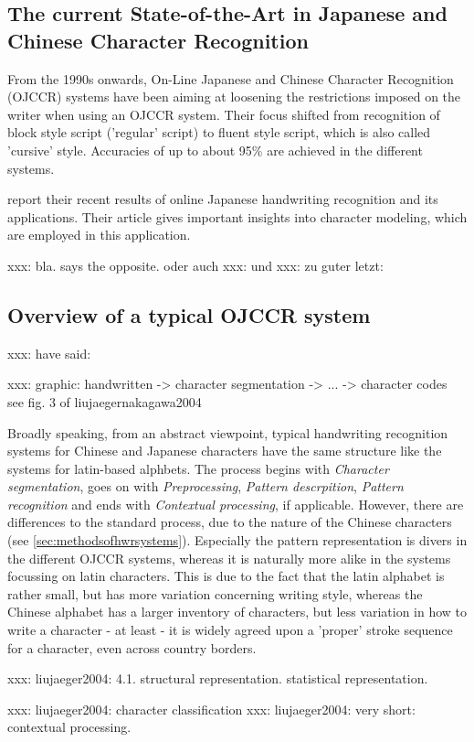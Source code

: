 \subsection{The current State-of-the-Art in Japanese and Chinese Character Recognition}
From the 1990s onwards, On-Line Japanese and Chinese Character Recognition 
(OJCCR) systems have been aiming at loosening the restrictions imposed on 
the writer when using an OJCCR system. Their focus shifted from recognition 
of block style script ('regular' script) to fluent style script, 
which is also called 'cursive' style. Accuracies of up to about 95\% are
achieved in the different systems.

\cite{Nakagawa2008} report their recent results of online Japanese 
handwriting recognition and its applications. Their article gives 
important insights into character modeling, which are employed in 
this application.

xxx: bla.  says the opposite. \cite{ChenLee1996} oder auch 
xxx: \cite{Nakagawa2008} und \cite{Nakai2003} 
xxx: zu guter letzt: \cite{Santosh2009}

\subsection{Overview of a typical OJCCR system}

xxx:  \cite{LiuJaegerNakagawa2004} have said: 

xxx:  graphic:
handwritten -> character segmentation -> ... -> character codes
see fig. 3 of liujaegernakagawa2004

Broadly speaking, from an abstract viewpoint, typical handwriting recognition 
systems for Chinese and Japanese characters have the same structure like the
systems for latin-based alphbets. The process begins with \emph{Character 
segmentation}, goes on with \emph{Preprocessing}, \emph{Pattern descrpition}, 
\emph{Pattern recognition} and ends with \emph{Contextual processing}, 
if applicable. However, there are differences to the standard process, due to 
the nature of the Chinese characters (see \ref{sec:methodsofhwrsystems}).
Especially the pattern representation is divers in the different OJCCR systems,
whereas it is naturally more alike in the systems focussing on latin characters.
This is due to the fact that the latin alphabet is rather small, but has more
variation concerning writing style, whereas the Chinese alphabet has a larger 
inventory of characters, but less variation in how to write a character - at
least - it is widely agreed upon a 'proper' stroke sequence for a character,
even across country borders.

xxx: liujaeger2004: 4.1. structural representation. statistical representation.

xxx: liujaeger2004: character classification
xxx: liujaeger2004: very short: contextual processing.




